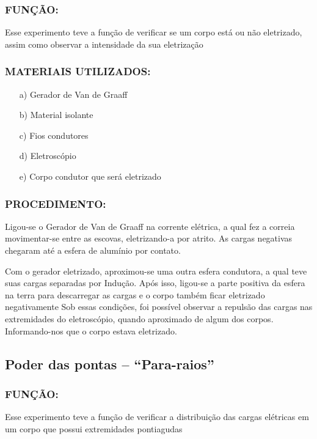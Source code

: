 \subsubsection{FUNÇÃO:}

\noindent Esse experimento teve a função de verificar se um corpo está ou não eletrizado, assim como observar a intensidade da sua eletrização

\subsubsection{MATERIAIS UTILIZADOS:} 
\begin{itemize}
    \item[a)] Gerador de Van de Graaff
    \item[b)] Material isolante
    \item[c)] Fios condutores
    \item[d)] Eletroscópio
    \item[e)] Corpo condutor que será eletrizado
\end{itemize}

\subsubsection{PROCEDIMENTO:} 
Ligou-se o Gerador de Van de Graaff na corrente elétrica, a qual fez a correia movimentar-se entre as escovas, eletrizando-a por atrito. As cargas negativas chegaram até a esfera de alumínio por contato.

\noindent Com o gerador eletrizado, aproximou-se uma outra esfera condutora, a qual teve suas cargas separadas por Indução. Após isso, ligou-se a parte positiva da esfera na terra para descarregar as cargas e o corpo também ficar eletrizado negativamente
Sob essas condições, foi possível observar a repulsão das cargas nas extremidades do eletroscópio, quando aproximado de algum dos corpos. Informando-nos que o corpo estava eletrizado.

\subsection{Poder das pontas – “Para-raios”}

\subsubsection{FUNÇÃO:}
Esse experimento teve a função de verificar a distribuição das cargas elétricas em um corpo que 
possui extremidades pontiagudas
